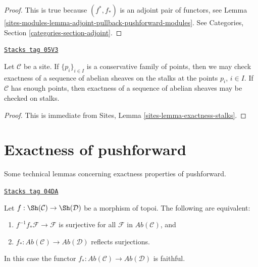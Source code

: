 \begin{proof}
This is true because $(f^*, f_*)$ is an adjoint pair
of functors, see
Lemma \ref{sites-modules-lemma-adjoint-pullback-pushforward-modules}.
See Categories, Section \ref{categories-section-adjoint}.
\end{proof}

\begin{lemma}
\label{sites-modules-lemma-check-exactness-stalks}
\href{https://stacks.math.columbia.edu/tag/05V3}{\texttt{Stacks tag 05V3}}

Let $\mathcal{C}$ be a site. If $\{p_i\}_{i \in I}$ is a conservative
family of points, then we may check exactness of a sequence of abelian
sheaves on the stalks at the points $p_i$, $i \in I$.
If $\mathcal{C}$ has enough points, then
exactness of a sequence of abelian sheaves may
be checked on stalks.
\end{lemma}

\begin{proof}
This is immediate from
Sites, Lemma \ref{sites-lemma-exactness-stalks}.
\end{proof}

\section{Exactness of pushforward}
\label{sites-modules-section-pushforward}
Some technical lemmas concerning exactness properties of pushforward.

\begin{lemma}
\label{sites-modules-lemma-reflect-surjections}
\href{https://stacks.math.columbia.edu/tag/04DA}{\texttt{Stacks tag 04DA}}

Let $f : \Sh(\mathcal{C}) \to \Sh(\mathcal{D})$ be
a morphism of topoi. The following are equivalent:
\begin{enumerate}
\item $f^{-1}f_*\mathcal{F} \to \mathcal{F}$ is surjective for
all $\mathcal{F}$ in $\textit{Ab}(\mathcal{C})$, and
\item $f_* : \textit{Ab}(\mathcal{C}) \to \textit{Ab}(\mathcal{D})$
reflects surjections.
\end{enumerate}
In this case the functor
$f_* : \textit{Ab}(\mathcal{C}) \to \textit{Ab}(\mathcal{D})$
is faithful.
\end{lemma}

